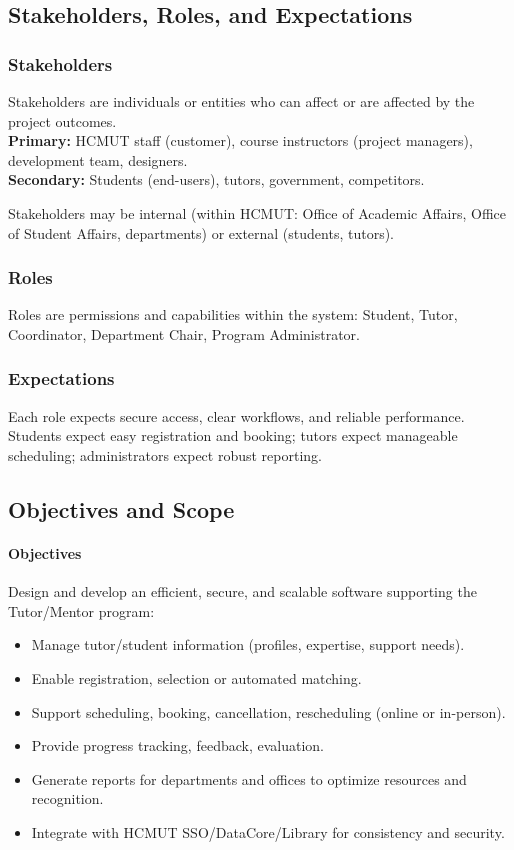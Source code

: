 \subsection{Stakeholders, Roles, and Expectations}
\subsubsection{Stakeholders}
Stakeholders are individuals or entities who can affect or are affected by the project outcomes.\\[4pt]
\textbf{Primary:} HCMUT staff (customer), course instructors (project managers), development team, designers.\\
\textbf{Secondary:} Students (end-users), tutors, government, competitors.

Stakeholders may be internal (within HCMUT: Office of Academic Affairs, Office of Student Affairs, departments) or external (students, tutors).

\subsubsection{Roles}
Roles are permissions and capabilities within the system: Student, Tutor, Coordinator, Department Chair, Program Administrator.

\subsubsection{Expectations}
Each role expects secure access, clear workflows, and reliable performance. Students expect easy registration and booking; tutors expect manageable scheduling; administrators expect robust reporting.

\subsection{Objectives and Scope}
\paragraph{Objectives} Design and develop an efficient, secure, and scalable software supporting the Tutor/Mentor program:
\begin{itemize}
  \item Manage tutor/student information (profiles, expertise, support needs).
  \item Enable registration, selection or automated matching.
  \item Support scheduling, booking, cancellation, rescheduling (online or in-person).
  \item Provide progress tracking, feedback, evaluation.
  \item Generate reports for departments and offices to optimize resources and recognition.
  \item Integrate with HCMUT SSO/DataCore/Library for consistency and security.
\end{itemize}

